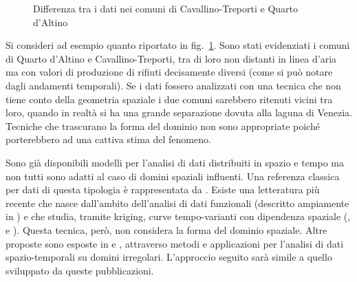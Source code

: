 \documentclass[a4paper,11pt,twoside,openright]{book}							%
\begin{document}
\begin{figure}[h]
	\centering
	\caption{Differenza tra i dati nei comuni di Cavallino-Treporti e Quarto d'Altino}
	\label{fig:intro3}
\end{figure}

Si consideri ad esempio quanto riportato in fig.~\ref{fig:intro3}. Sono stati evidenziati i comuni di Quarto d'Altino e Cavallino-Treporti, tra di loro non distanti in linea d'aria ma con valori di produzione di rifiuti decisamente diversi (come si può notare dagli andamenti temporali). Se i dati fossero analizzati con una tecnica che non tiene conto della geometria spaziale i due comuni sarebbero ritenuti vicini tra loro, quando in realtà si ha una grande separazione dovuta alla laguna di Venezia. Tecniche che trascurano la forma del dominio non sono appropriate poiché porterebbero ad una cattiva stima del fenomeno.

Sono già disponibili modelli per l'analisi di dati distribuiti in spazio e tempo ma non tutti sono adatti al caso di domini spaziali influenti. Una referenza classica per dati di questa tipologia è rappresentata da \cite{art:cressie}. Esiste una letteratura più recente che nasce dall'ambito dell'analisi di dati funzionali (descritto ampiamente in \cite{art:ramsaysilverman}) e che studia, tramite kriging, curve tempo-varianti con dipendenza spaziale (\cite{art:caballero}, \cite{art:menafoglio2} e \cite{art:menafoglio1}). Questa tecnica, però, non considera la forma del dominio spaziale. Altre proposte sono esposte in \cite{art:augustin} e \cite{art:marra}, attraverso metodi e applicazioni per l'analisi di dati spazio-temporali su domini irregolari. L'approccio seguito sarà simile a quello sviluppato da queste pubblicazioni.
\end{document}
